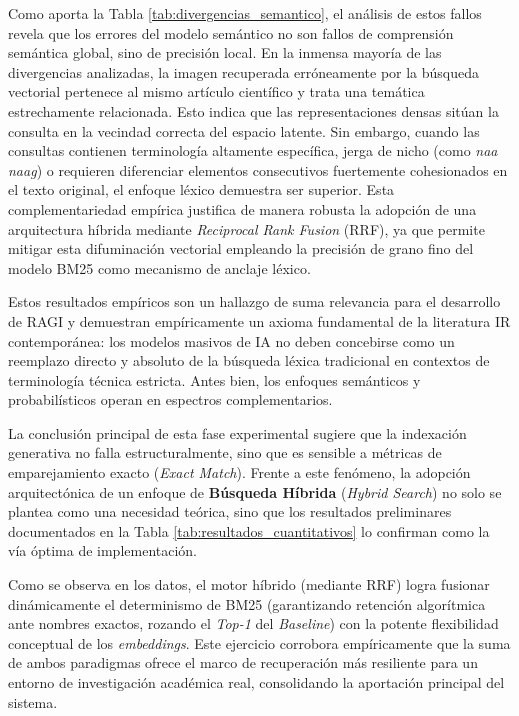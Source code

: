 \documentclass[a4paper]{report}
\begin{document}
Como aporta la Tabla \ref{tab:divergencias_semantico}, el análisis de estos fallos revela que los errores del modelo semántico no son fallos de comprensión semántica global, sino de precisión local. En la inmensa mayoría de las divergencias analizadas, la imagen recuperada erróneamente por la búsqueda vectorial pertenece al mismo artículo científico y trata una temática estrechamente relacionada. Esto indica que las representaciones densas sitúan la consulta en la vecindad correcta del espacio latente. Sin embargo, cuando las consultas contienen terminología altamente específica, jerga de nicho (como \textit{naa naag}) o requieren diferenciar elementos consecutivos fuertemente cohesionados en el texto original, el enfoque léxico demuestra ser superior. Esta complementariedad empírica justifica de manera robusta la adopción de una arquitectura híbrida mediante \textit{Reciprocal Rank Fusion} (RRF), ya que permite mitigar esta difuminación vectorial empleando la precisión de grano fino del modelo BM25 como mecanismo de anclaje léxico.

Estos resultados empíricos son un hallazgo de suma relevancia para el desarrollo de RAGI y demuestran empíricamente un axioma fundamental de la literatura IR contemporánea: los modelos masivos de IA no deben concebirse como un reemplazo directo y absoluto de la búsqueda léxica tradicional en contextos de terminología técnica estricta. Antes bien, los enfoques semánticos y probabilísticos operan en espectros complementarios. 

La conclusión principal de esta fase experimental sugiere que la indexación generativa no falla estructuralmente, sino que es sensible a métricas de emparejamiento exacto (\textit{Exact Match}). Frente a este fenómeno, la adopción arquitectónica de un enfoque de \textbf{Búsqueda Híbrida} (\textit{Hybrid Search}) no solo se plantea como una necesidad teórica, sino que los resultados preliminares documentados en la Tabla \ref{tab:resultados_cuantitativos} lo confirman como la vía óptima de implementación. 

Como se observa en los datos, el motor híbrido (mediante RRF) logra fusionar dinámicamente el determinismo de BM25 (garantizando retención algorítmica ante nombres exactos, rozando el \textit{Top-1} del \textit{Baseline}) con la potente flexibilidad conceptual de los \textit{embeddings}. Este ejercicio corrobora empíricamente que la suma de ambos paradigmas ofrece el marco de recuperación más resiliente para un entorno de investigación académica real, consolidando la aportación principal del sistema.
\end{document}
